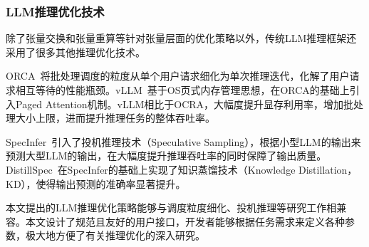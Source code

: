 \subsubsection{LLM推理优化技术}

除了张量交换和张量重算等针对张量层面的优化策略以外，传统LLM推理框架还采用了很多其他推理优化技术。

ORCA~\cite{ORCA}将批处理调度的粒度从单个用户请求细化为单次推理迭代，化解了用户请求相互等待的性能瓶颈。vLLM~\cite{vLLM}基于OS页式内存管理思想，在ORCA的基础上引入Paged Attention机制。vLLM相比于OCRA，大幅度提升显存利用率，增加批处理大小上限，进而提升推理任务的整体吞吐率。

SpecInfer~\cite{SpecInfer}引入了投机推理技术（Speculative Sampling），根据小型LLM的输出来预测大型LLM的输出，在大幅度提升推理吞吐率的同时保障了输出质量。DistillSpec~\cite{DistillSpec}在SpecInfer的基础上实现了知识蒸馏技术（Knowledge Distillation，KD），使得输出预测的准确率显著提升。

本文提出的LLM推理优化策略能够与调度粒度细化、投机推理等研究工作相兼容。本文设计了规范且友好的用户接口，开发者能够根据任务需求来定义各种参数，极大地方便了有关推理优化的深入研究。


  

  

